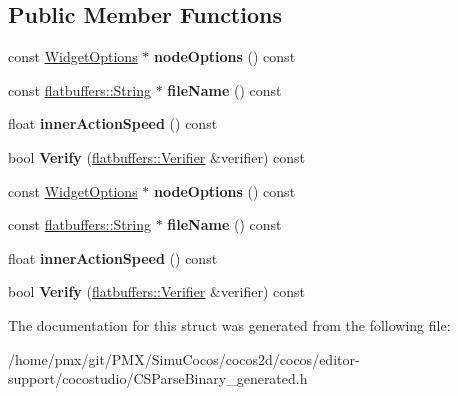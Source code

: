 \subsection*{Public Member Functions}
\begin{DoxyCompactItemize}
\item 
\mbox{\label{structflatbuffers_1_1ProjectNodeOptions_a008ba3aa21c003e87da537531ea5022c}} 
const \hyperlink{structflatbuffers_1_1WidgetOptions}{Widget\+Options} $\ast$ {\bfseries node\+Options} () const
\item 
\mbox{\label{structflatbuffers_1_1ProjectNodeOptions_a7412bdc7d8b895f65e1ce475d593aba3}} 
const \hyperlink{structflatbuffers_1_1String}{flatbuffers\+::\+String} $\ast$ {\bfseries file\+Name} () const
\item 
\mbox{\label{structflatbuffers_1_1ProjectNodeOptions_a68390e00018ee769293e6a3fb2efd147}} 
float {\bfseries inner\+Action\+Speed} () const
\item 
\mbox{\label{structflatbuffers_1_1ProjectNodeOptions_acca0e4018d2f3eb3c829793819b6b416}} 
bool {\bfseries Verify} (\hyperlink{classflatbuffers_1_1Verifier}{flatbuffers\+::\+Verifier} \&verifier) const
\item 
\mbox{\label{structflatbuffers_1_1ProjectNodeOptions_a008ba3aa21c003e87da537531ea5022c}} 
const \hyperlink{structflatbuffers_1_1WidgetOptions}{Widget\+Options} $\ast$ {\bfseries node\+Options} () const
\item 
\mbox{\label{structflatbuffers_1_1ProjectNodeOptions_a7412bdc7d8b895f65e1ce475d593aba3}} 
const \hyperlink{structflatbuffers_1_1String}{flatbuffers\+::\+String} $\ast$ {\bfseries file\+Name} () const
\item 
\mbox{\label{structflatbuffers_1_1ProjectNodeOptions_a68390e00018ee769293e6a3fb2efd147}} 
float {\bfseries inner\+Action\+Speed} () const
\item 
\mbox{\label{structflatbuffers_1_1ProjectNodeOptions_acca0e4018d2f3eb3c829793819b6b416}} 
bool {\bfseries Verify} (\hyperlink{classflatbuffers_1_1Verifier}{flatbuffers\+::\+Verifier} \&verifier) const
\end{DoxyCompactItemize}


The documentation for this struct was generated from the following file\+:\begin{DoxyCompactItemize}
\item 
/home/pmx/git/\+P\+M\+X/\+Simu\+Cocos/cocos2d/cocos/editor-\/support/cocostudio/C\+S\+Parse\+Binary\+\_\+generated.\+h\end{DoxyCompactItemize}
